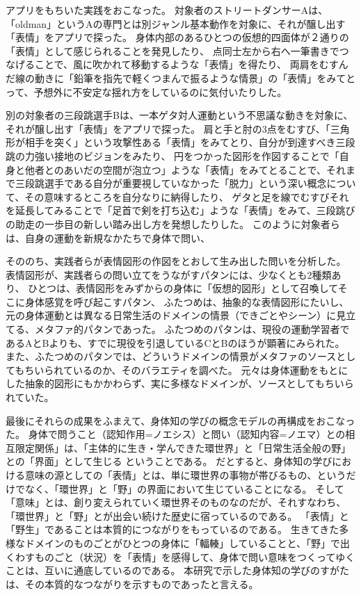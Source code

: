 アプリをもちいた実践をおこなった。
対象者のストリートダンサーAは、「oldman」というAの専門とは別ジャンル基本動作を対象に、それが醸し出す「表情」をアプリで探った。
身体内部のあるひとつの仮想的四面体が２通りの「表情」として感じられることを発見したり、
点同士左から右へ一筆書きでつなげることで、風に吹かれて移動するような「表情」を得たり、
両肩をむすんだ線の動きに「鉛筆を指先で軽くつまんで振るような情景」の「表情」をみてとって、予想外に不安定な揺れ方をしているのに気付いたりした。

別の対象者の三段跳選手Bは、一本ゲタ対人運動という不思議な動きを対象に、それが醸し出す「表情」をアプリで探った。
肩と手と肘の3点をむすび、「三角形が相手を突く」という攻撃性ある「表情」をみてとり、自分が到達すべき三段跳の力強い接地のビジョンをみたり、
円をつかった図形を作図することで「自身と他者とのあいだの空間が泡立つ」ような「表情」をみてとることで、それまで三段跳選手である自分が重要視していなかった「脱力」という深い概念について、その意味するところを自分なりに納得したり、
ゲタと足を線でむすびそれを延長してみることで「足首で剣を打ち込む」ような「表情」をみて、三段跳びの助走の一歩目の新しい踏み出し方を発想したりした。
このように対象者らは、自身の運動を新規なかたちで身体で問い、

そののち、実践者らが表情図形の作図をとおして生み出した問いを分析した。
表情図形が、実践者らの問い立てをうながすパタンには、少なくとも2種類あり、
ひとつは、表情図形をみずからの身体に「仮想的図形」として召喚してそこに身体感覚を呼び起こすパタン、
ふたつめは、抽象的な表情図形にたいし、元の身体運動とは異なる日常生活のドメインの情景（できごとやシーン）に見立てる、メタファ的パタンであった。
ふたつめのパタンは、現役の運動学習者であるAとBよりも、すでに現役を引退しているCとBのほうが顕著にみられた。
また、ふたつめのパタンでは、どういうドメインの情景がメタファのソースとしてもちいられているのか、そのバラエティを調べた。
元々は身体運動をもとにした抽象的図形にもかかわらず、実に多様なドメインが、ソースとしてもちいられていた。

最後にそれらの成果をふまえて、身体知の学びの概念モデルの再構成をおこなった。
身体で問うこと（認知作用=ノエシス）と問い（認知内容=ノエマ）との相互限定関係」は、「主体的に生き・学んできた環世界」と「日常生活全般の野」との「界面」として生じる ということである。
だとすると、身体知の学びにおける意味の源としての「表情」とは、単に環世界の事物が帯びるもの、というだけでなく、「環世界」と「野」の界面において生じていることになる。
そして「意味」とは、創り変えられていく環世界そのものなのだが、それすなわち、「環世界」と「野」とが出会い続けた歴史に宿っているのである。
「表情」と「野生」であることは本質的につながりをもっているのである。
生きてきた多様なドメインのものごとがひとつの身体に「輻輳」していることと、「野」で出くわすものごと（状況）を「表情」を感得して、身体で問い意味をつくってゆくことは、互いに通底しているのである。
本研究で示した身体知の学びのすがたは、その本質的なつながりを示すものであったと言える。

